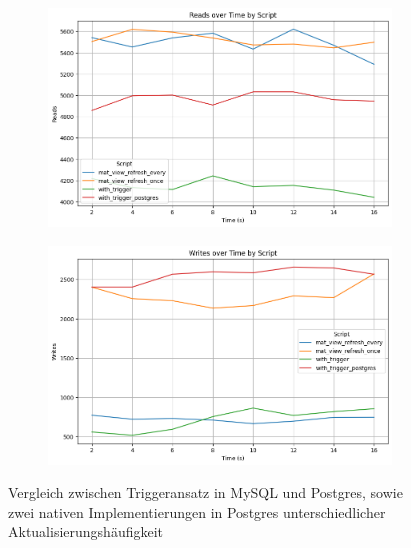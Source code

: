 \begin{figure}[H]
    \centering
    \begin{subfigure}[t]{0.48\textwidth}
        \centering
        \includegraphics[width=\textwidth]{PNGs/Script/Views/mat-view-comparison//Reads}
        \label{mat-view-comparison-reads}
    \end{subfigure}
    \hfill
    \begin{subfigure}[t]{0.48\textwidth}
        \centering
        \includegraphics[width=\textwidth]{PNGs/Script/Views/mat-view-comparison/Writes}
        \label{mat-view-comparison-writes}
    \end{subfigure}
    \vspace{-20pt}
    \caption[Views: Metrikvergleich]{Vergleich zwischen Triggeransatz in MySQL und Postgres, sowie zwei nativen Implementierungen in Postgres unterschiedlicher Aktualisierungshäufigkeit }
    \label{fig:mat-view-comparison-comp-metric}
\end{figure}
\vspace{-20pt}

